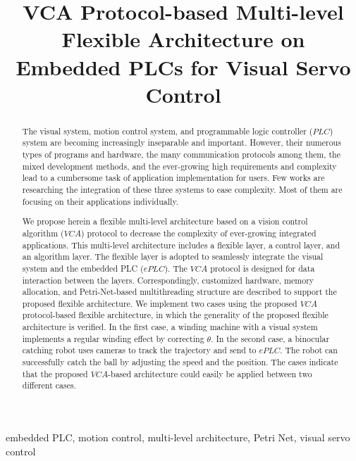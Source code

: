 \documentclass[journal,UTF8]{IEEEtran}
\begin{document}
	\title{VCA  Protocol-based Multi-level Flexible Architecture on Embedded PLCs for Visual Servo Control}
	
	\maketitle
	
	\begin{abstract}
		The visual system, motion control system, and programmable logic controller ($PLC$) system are becoming increasingly inseparable and important. However, their numerous types of programs and hardware, the many communication protocols among them, the mixed development methods, and the ever-growing high requirements and complexity lead to a cumbersome task of application implementation for users. Few works are researching the integration of these three systems to ease complexity. Most of them are focusing on their applications individually. 
		
		We propose herein a flexible multi-level architecture based on a vision control algorithm ($VCA$) protocol to decrease the complexity of ever-growing integrated applications. This multi-level architecture includes a flexible layer, a control layer, and an algorithm layer. The flexible layer is adopted to seamlessly integrate the visual system and the embedded PLC ($ePLC$). The $VCA$ protocol is designed for data interaction between the layers. Correspondingly, customized hardware, memory allocation, and Petri-Net-based multithreading structure are described to support the proposed flexible architecture. We implement two cases using the proposed $VCA$ protocol-based flexible architecture, in which the generality of the proposed flexible architecture is verified. In the first case, a winding machine with a visual system implements a regular winding effect by correcting $\theta$. In the second case, a binocular catching robot uses cameras to track the trajectory and send to $ePLC$. The robot can successfully catch the ball by adjusting the speed and the position. The cases indicate that the proposed $VCA$-based architecture could easily be applied between two different cases.
	\end{abstract}
	
	\begin{IEEEkeywords}
		embedded PLC, motion control, multi-level architecture, Petri Net, visual servo control
	\end{IEEEkeywords}
	
\end{document}
